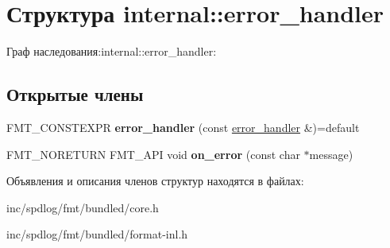 \hypertarget{structinternal_1_1error__handler}{}\section{Структура internal\+:\+:error\+\_\+handler}
\label{structinternal_1_1error__handler}


Граф наследования\+:internal\+:\+:error\+\_\+handler\+:
\subsection*{Открытые члены}
\begin{DoxyCompactItemize}
\item 
\mbox{\label{structinternal_1_1error__handler_ae980ce1699908f0ce677723c09beee7e}} 
F\+M\+T\+\_\+\+C\+O\+N\+S\+T\+E\+X\+PR {\bfseries error\+\_\+handler} (const \hyperlink{structinternal_1_1error__handler}{error\+\_\+handler} \&)=default
\item 
\mbox{\label{structinternal_1_1error__handler_a46e83c008db275b6a59df9c650cec324}} 
F\+M\+T\+\_\+\+N\+O\+R\+E\+T\+U\+RN F\+M\+T\+\_\+\+A\+PI void {\bfseries on\+\_\+error} (const char $\ast$message)
\end{DoxyCompactItemize}


Объявления и описания членов структур находятся в файлах\+:\begin{DoxyCompactItemize}
\item 
inc/spdlog/fmt/bundled/core.\+h\item 
inc/spdlog/fmt/bundled/format-\/inl.\+h\end{DoxyCompactItemize}
